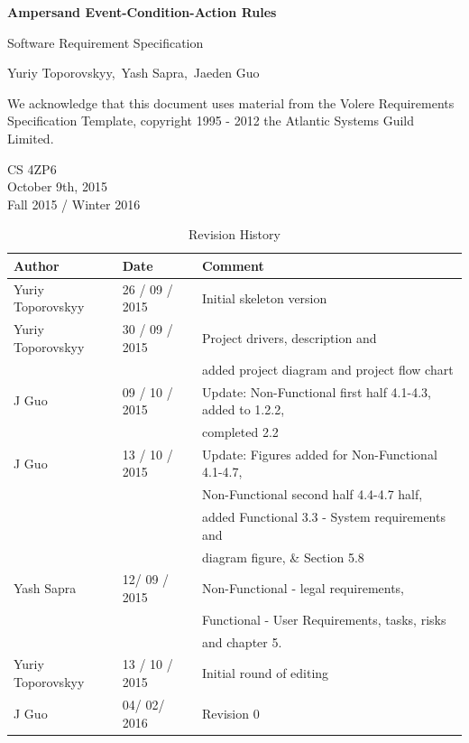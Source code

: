 \documentclass[12pt]{report}
\begin{document}
\begin{titlepage}\begin{center}
\thispagestyle{empty} %

\vspace*{1cm}

{\Huge\textbf{Ampersand Event-Condition-Action Rules}}

\vspace{0.5cm}
{\Large Software Requirement Specification 
	

\vspace{1.5cm}
Yuriy Toporovskyy,\ Yash Sapra,\ Jaeden Guo}
\vfill

We acknowledge that this document uses material from the Volere Requirements
Specification Template, copyright 1995 - 2012 the Atlantic Systems Guild
Limited.

\vspace{0.8cm}
\end{center}
CS 4ZP6 \\
October 9th, 2015 \\ 
Fall 2015 / Winter 2016 
\end{titlepage}


\begin{table}[ht!]\begin{center}
\caption{Revision History}  
\begin{tabular}{|l|l|l|}\hline
\textbf{Author} & \textbf{Date} & \textbf{Comment} \\\hline 
Yuriy Toporovskyy & 26 / 09 / 2015 & Initial skeleton version \\\hline
Yuriy Toporovskyy & 30 / 09 / 2015 & Project drivers, description and \\ & & 
added project diagram and project flow chart \\\hline
J Guo & 09 / 10 / 2015 & Update: Non-Functional first half 4.1-4.3, added to 
1.2.2, \\ & & completed 2.2 \\\hline
J Guo & 13 / 10 / 2015 & Update: Figures added for Non-Functional 4.1-4.7,  \\ 
& & 
Non-Functional second half 4.4-4.7 half, \\ & & added Functional 3.3 - System 
requirements  and \\ 
& & diagram figure, \& Section 5.8 \\\hline
Yash Sapra &  12/ 09 / 2015 & Non-Functional - legal requirements, \\ & & Functional - User 
Requirements, tasks, risks \\ & & and chapter 5.
\\\hline
Yuriy Toporovskyy & 13 / 10 / 2015 & Initial round of editing \\\hline
J Guo & 04/ 02/ 2016 & Revision 0\\\hline
\end{tabular}
\end{center}\end{table}
\end{document}

